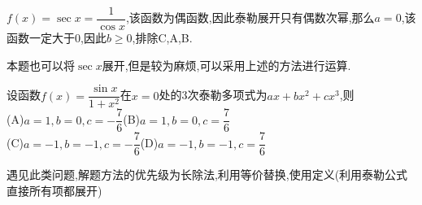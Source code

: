 \documentclass[8pt a4paper, oneside, UTF8]{ctexbook}
\begin{document}
\begin{sloppypar}
    \begin{solution}
        $f(x)=\sec x=\dfrac{1}{\cos x}$,该函数为偶函数,因此泰勒展开只有偶数次幂,那么$a=0$,该函数一定大于0,因此$b \geq 0$,排除C,A,B.
    \end{solution}
    \begin{note}
        本题也可以将$\sec x$展开,但是较为麻烦,可以采用上述的方法进行运算.
    \end{note}
    \begin{problem}
        设函数$f(x)=\dfrac{\sin x}{1+x^2}$在$x=0$处的3次泰勒多项式为$ax + b x ^ 2 + c x ^ 3 $,则
        \\(A)$a=1,b=0,c=-\dfrac{7}{6}$\quad (B)$a=1,b=0,c=\dfrac{7}{6}$\\ (C)$a=-1,b=-1,c=-\dfrac{7}{6}$\quad (D)$a=-1,b=-1,c=\dfrac{7}{6}$
    \end{problem}
    \begin{note}
        遇见此类问题,解题方法的优先级为长除法,利用等价替换,使用定义(利用泰勒公式直接所有项都展开)
    \end{note}

\end{sloppypar}
\end{document}
